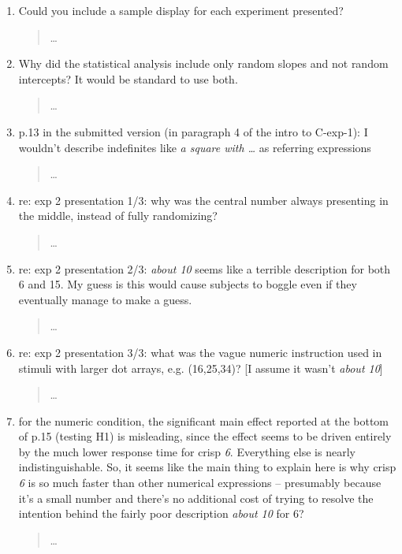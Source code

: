 \documentclass{tufte-handout}
\begin{document}
\begin{enumerate}
\item Could you include a sample display for each experiment presented?
\begin{quote}\ldots\end{quote}

\item Why did the statistical analysis include only random slopes and not random intercepts? It would be standard to use both.
\begin{quote}\ldots\end{quote}

\item p.13 in the submitted version (in paragraph 4 of the intro to C-exp-1): I wouldn't describe indefinites like \emph{a square with \ldots} as referring expressions
\begin{quote}\ldots\end{quote}

\item re: exp 2 presentation 1/3: why was the central number always presenting in the middle, instead of fully randomizing?
\begin{quote}\ldots\end{quote}

\item re: exp 2 presentation 2/3: \emph{about 10} seems like a terrible description for both 6 and 15. My guess is this would cause subjects to boggle even if they eventually manage to make a guess.
\begin{quote}\ldots\end{quote}

\item re: exp 2 presentation 3/3: what was the vague numeric instruction used in stimuli with larger dot arrays, e.g. (16,25,34)? [I assume it wasn't \emph{about 10}]
\begin{quote}\ldots\end{quote}

\item for the numeric condition, the significant main effect reported at the bottom of p.15 (testing H1) is misleading, since the effect seems to be driven entirely by the much lower response time for crisp \emph{6}. Everything else is nearly indistinguishable. So, it seems like the main thing to explain here is why crisp \emph{6} is so much faster than other numerical expressions -- presumably because it's a small number and there's no additional cost of trying to resolve the intention behind the fairly poor description \emph{about 10} for 6?
\begin{quote}\ldots\end{quote}


\end{enumerate}
\end{document}
